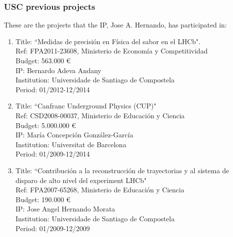 %
%

\subsubsection*{USC previous projects}

These are the projects that the IP, Jose A. Hernando, has participated in:

\begin{enumerate}

\item Title: ``Medidas de precisi\'on en F\'isica del sabor en el LHCb". \\
Ref:  FPA2011-23608, Ministerio de Econom\'ia y Competitividad \\
Budget: 563.000 \euro \\
IP: Bernardo Adeva Andany \\
Institution: Universidade de Santiago de Compostela \\
Period: 01/2012-12/2014

\item Title: ``Canfranc Underground Physics (CUP)"\\
Ref:  CSD2008-00037, Ministerio de Educaci\'on y Ciencia \\
Budget: 5.000.000 \euro \\
IP: Mar\'ia Concepci\'on Gonz\'alez-Garc\'ia \\
Institution: Universitat de Barcelona \\
Period: 01/2009-12/2014

\item Title: ``Contribuci\'on a la reconstrucci\'on de trayectorias y al sistema de disparo de alto nivel del experiment LHCb" \\
Ref:  FPA2007-65268, Ministerio de Educaci\'on y Ciencia \\
Budget:  190.000 \euro \\
IP: Jose Angel Hernando Morata \\ 
Institution: Universidade de Santiago de Compostela \\
Period: 01/2009-12/2009

\end{enumerate}
